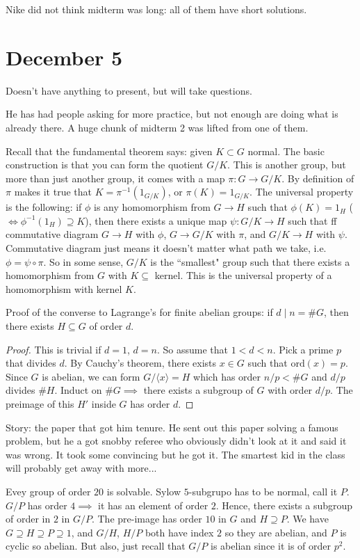 \documentclass{article}
\theoremstyle{plain}
\theoremstyle{remark}
\begin{document}
Nike did not think midterm was long: all of them have short solutions.

\section{December 5}
Doesn't have anything to present, but will take questions.

He has had people asking for more practice, but not enough are doing what is already there.
A huge chunk of midterm 2 was lifted from one of them.

Recall that the fundamental theorem says:
given $K \subset G$ normal.
The basic construction is that you can form the quotient $G/K$.
This is another group, but more than just another group,
it comes with a map $\pi \colon G \to G/K$.
By definition of $\pi$ makes it true that $K = \pi^{-1}(1_{G/K})$,
or $\pi(K) = 1_{G/K}$.
The universal property is the following:
if $\phi$ is any homomorphism from $G \to H$ such that
$\phi(K) = 1_H$ ($\iff \phi^{-1}(1_H) \supseteq K$),
then there exists a unique map $\psi \colon G/K \to H$ such that
ff commutative diagram $G \to H$ with $\phi$, $G \to G/K$ with $\pi$, and $G/K \to H$ with $\psi$.
Commutative diagram just means it doesn't matter what path we take,
i.e. $\phi = \psi \circ \pi$.
So in some sense,
$G/K$ is the ``smallest" group such that there exists a homomorphism from $G$
with $K \subseteq$ kernel.
This is the universal property of a homomorphism with kernel $K$.

Proof of the converse to Lagrange's for finite abelian groups:
if $d \mid n = \#G$, then there exists $H \subseteq G$ of order $d$.
\begin{proof}
	This is trivial if $d = 1$, $d = n$.
	So assume that $1 < d < n$.
	Pick a prime $p$ that divides $d$.
	By Cauchy's theorem, there exists $x \in G$ such that $\mathrm{ord}(x) = p$.
	Since $G$ is abelian, we can form $G / \langle x \rangle = H$ which
	has order $n/p < \#G$
	and $d/p$ divides $\#H$.
	Induct on $\#G \implies$ there exists a subgroup of $G$ with order $d/p$.
	The preimage of this $H'$ inside $G$ has order $d$.
\end{proof}

Story: the paper that got him tenure.
He sent out this paper solving a famous problem,
but he a got snobby referee who obviously didn't look at it and said it was wrong.
It took some convincing but he got it.
The smartest kid in the class will probably get away with more...

Evey group of order $20$ is solvable.
Sylow $5$-subgrupo has to be normal, call it $P$.
$G/P$ has order $4 \implies$ it has an element of order $2$.
Hence, there exists a subgroup of order in $2$ in $G/P$.
The pre-image has order $10$ in $G$ and $H \supseteq P$.
We have $G \supseteq H \supseteq P \supseteq 1$,
and $G/H$, $H/P$ both have index $2$ so they are abelian,
and $P$ is cyclic so abelian.
But also, just recall that $G/P$ is abelian since it is of order $p^2$.
\end{document}

